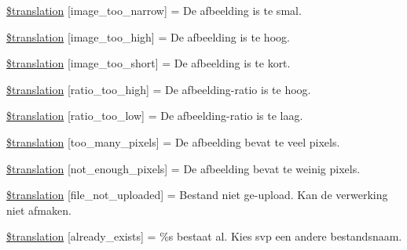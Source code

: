\begin{DoxyCompactItemize}
\hyperlink{class_8upload_8nl___n_l_8php_a5c9a4cd67fd21c32e0a3b434591a6037}{\$translation} \mbox{[}\textquotesingle{}image\+\_\+too\+\_\+narrow\textquotesingle{}\mbox{]} = \textquotesingle{}De afbeelding is te smal.\textquotesingle{}
\item 
\hyperlink{class_8upload_8nl___n_l_8php_aa27bde361343f3b63c7cd441860024f8}{\$translation} \mbox{[}\textquotesingle{}image\+\_\+too\+\_\+high\textquotesingle{}\mbox{]} = \textquotesingle{}De afbeelding is te hoog.\textquotesingle{}
\item 
\hyperlink{class_8upload_8nl___n_l_8php_a86fcd4e1157b00032df451188d735527}{\$translation} \mbox{[}\textquotesingle{}image\+\_\+too\+\_\+short\textquotesingle{}\mbox{]} = \textquotesingle{}De afbeelding is te kort.\textquotesingle{}
\item 
\hyperlink{class_8upload_8nl___n_l_8php_a23396f6ce7f31e5e5f1b57580621d982}{\$translation} \mbox{[}\textquotesingle{}ratio\+\_\+too\+\_\+high\textquotesingle{}\mbox{]} = \textquotesingle{}De afbeelding-\/ratio is te hoog.\textquotesingle{}
\item 
\hyperlink{class_8upload_8nl___n_l_8php_ac533b9a479f056b0b8623e4268f068c2}{\$translation} \mbox{[}\textquotesingle{}ratio\+\_\+too\+\_\+low\textquotesingle{}\mbox{]} = \textquotesingle{}De afbeelding-\/ratio is te laag.\textquotesingle{}
\item 
\hyperlink{class_8upload_8nl___n_l_8php_aa4051ef64e94a3f8295c63cf85544016}{\$translation} \mbox{[}\textquotesingle{}too\+\_\+many\+\_\+pixels\textquotesingle{}\mbox{]} = \textquotesingle{}De afbeelding bevat te veel pixels.\textquotesingle{}
\item 
\hyperlink{class_8upload_8nl___n_l_8php_a1fe342c27ce61f4ff4e0120ba647033e}{\$translation} \mbox{[}\textquotesingle{}not\+\_\+enough\+\_\+pixels\textquotesingle{}\mbox{]} = \textquotesingle{}De afbeelding bevat te weinig pixels.\textquotesingle{}
\item 
\hyperlink{class_8upload_8nl___n_l_8php_a4ce76e7be0b3a03c2b47f6d70c21832e}{\$translation} \mbox{[}\textquotesingle{}file\+\_\+not\+\_\+uploaded\textquotesingle{}\mbox{]} = \textquotesingle{}Bestand niet ge-\/upload. Kan de verwerking niet afmaken.\textquotesingle{}
\item 
\hyperlink{class_8upload_8nl___n_l_8php_afd84e910217f04139f567c41e292afa5}{\$translation} \mbox{[}\textquotesingle{}already\+\_\+exists\textquotesingle{}\mbox{]} = \textquotesingle{}\%s bestaat al. Kies svp een andere bestandsnaam.\textquotesingle{}
\item 

\end{DoxyCompactItemize}
